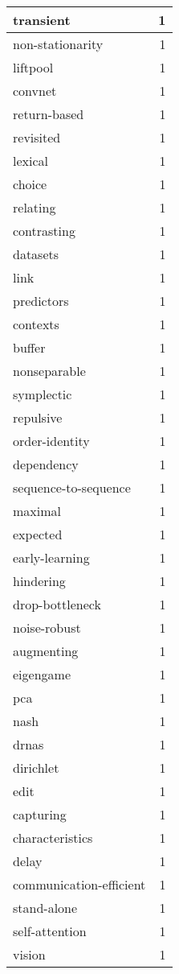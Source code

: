 \begin{table}[h]
\begin{tabular}{|l|r|}
\hline
transient & 1 \\
\hline
non-stationarity & 1 \\
\hline
liftpool & 1 \\
\hline
convnet & 1 \\
\hline
return-based & 1 \\
\hline
revisited & 1 \\
\hline
lexical & 1 \\
\hline
choice & 1 \\
\hline
relating & 1 \\
\hline
contrasting & 1 \\
\hline
datasets & 1 \\
\hline
link & 1 \\
\hline
predictors & 1 \\
\hline
contexts & 1 \\
\hline
buffer & 1 \\
\hline
nonseparable & 1 \\
\hline
symplectic & 1 \\
\hline
repulsive & 1 \\
\hline
order-identity & 1 \\
\hline
dependency & 1 \\
\hline
sequence-to-sequence & 1 \\
\hline
maximal & 1 \\
\hline
expected & 1 \\
\hline
early-learning & 1 \\
\hline
hindering & 1 \\
\hline
drop-bottleneck & 1 \\
\hline
noise-robust & 1 \\
\hline
augmenting & 1 \\
\hline
eigengame & 1 \\
\hline
pca & 1 \\
\hline
nash & 1 \\
\hline
drnas & 1 \\
\hline
dirichlet & 1 \\
\hline
edit & 1 \\
\hline
capturing & 1 \\
\hline
characteristics & 1 \\
\hline
delay & 1 \\
\hline
communication-efficient & 1 \\
\hline
stand-alone & 1 \\
\hline
self-attention & 1 \\
\hline
vision & 1 \\

\end{tabular}
\end{table}
